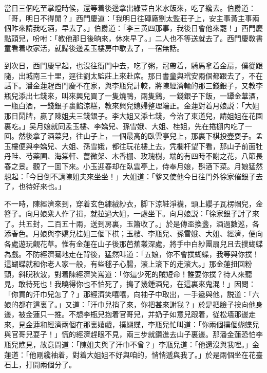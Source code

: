 當日三個吃至掌燈時候，還等着後邊拿出綠荳白米水飯來，吃了纔去。伯爵道：「哥，明日不得閒？」西門慶道：「我明日往磚廠劉太監莊子上，安主事黃主事兩個昨來請我吃酒，早去了。」伯爵道：「李三黄四那事，我後日會他來罷！」西門慶點頭兒，吩咐：「教他那日後晌來，休來早了。」二人也不等送就去了。西門慶敎書童看着收家活，就歸後邊孟玉樓房中歇去了，一宿無話。

到次日，西門慶早起，也沒往衙門中去，吃了粥，冠帶着，騎馬拿着金扇，僕從跟隨，出城南三十里，逕往劉太監莊上來赴席。那日書童與玳安兩個都跟去了，不在話下。潘金蓮趕西門慶不在家，與李瓶兒計較，將陳經濟輸的那三錢銀子，又教李瓶兒添出七錢來，叫來興兒買了一隻燒鴨，兩隻鷄，一錢銀子下飯，一罈金華酒，一瓶白酒，一錢銀子裹餡涼糕，教來興兒媳婦整理端正。金蓮對着月娘説：「大姐那日鬦牌，贏了陳姐夫三錢銀子。李大姐又添七錢，今治了東道兒，請姐姐在花園裏吃。」吴月娘就同孟玉樓、李嬌兒、孫雪娥、大姐、桂姐，先在捲棚内吃了一回。然後拿了酒菜兒，往山子上，一個最高的臥雲亭兒上，那裏下棋投壺耍子。孟玉樓便與李嬌兒、大姐、孫雪娥，都往玩花樓上去，凭欄杆望下看，那山子前面牡丹畦、芍薬圃、海棠軒、薔微架、木香棚、玫瑰樹，端的有四時不謝之花，八節長春之景。觀了一囬下來。小玉迎春却在臥雲亭上，侍奉月娘，斟酒下菜。月娘猛然想起：「今日倒不請陳姐夫來坐坐！」大姐道：「爹又使他今日往門外徐家催銀子去了，也待好來也。」

不一時，陳經濟來到，穿着玄色練絨紗衣，脚下涼鞋淨襪，頭上纓子瓦楞帽兒，金簪子。向月娘衆人作了揖，就拉過大姐，一處坐下。向月娘説：「徐家銀子討了來了。共五封，二百五十兩，送到房裏，玉簫收了。」於是傳盃換盞，酒過數巡，各添春色。月娘與李嬌兒桂姐三個下棋；玉樓、李瓶兒、孫雪娥、大姐、經濟，便向各處遊玩觀花草。惟有金蓮在山子後那芭蕉叢深處，將手中白紗團扇兒且去撲蝴蝶為戲。不防經濟驀地走在背後，猛然叫道：「五娘，你不會撲蝴蝶，我等與你撲！這蝴蝶就和你老人家一般，有些毬子心腸，滚上滚下的走滚大。」那金蓮扭回粉頸，斜睨秋波，對着陳經濟笑罵道：「你這少死的賊短命！誰要你撲？待人來聽見，敢待死也！我曉得你也不怕死了，搗了幾鍾酒兒，在這裏來鬼混！」因問：「你買的汗巾兒怎了？」那經濟笑嘻嘻，向袖子中取出，一手遞與他，説道：「六娘的都在這裏了。」又道：「汗巾兒捎了來，你把甚來謝我？」於是把臉子挨向他身邊，被金蓮只一推。不想李瓶兒抱着官哥兒，并奶子如意兒跟着，従松墻那邊走來，見金蓮和經濟兩個在那裏嬉戲，撲蝴蝶，李瓶兒忙叫道：「你兩個撲個蝴蝶兒與官哥兒耍子！」慌的經濟趕眼不見，兩三步就鑽進去山子裏邊。那潘金蓮恐怕李瓶兒瞧見，故意問道：「陳姐夫與了汗巾不曾？」李瓶兒道：「他還沒與我哩。」金蓮道：「他剛纔袖着，對着大姐姐不好與咱的，悄悄遞與我了。」於是兩個坐在花臺石上，打開兩個分了。

